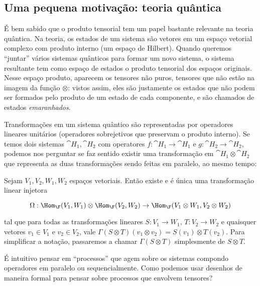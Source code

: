 \documentclass[11pt]{article}
\begin{document}
\subsection{Uma pequena motivação: teoria quântica}
\label{sec:uma-pequena-motivacao-teoria-quantica}
É bem sabido que o produto tensorial tem um papel bastante relevante na teoria quântica. Na teoria, os estados de um sistema são vetores em um espaço vetorial complexo com produto interno (um espaço de Hilbert). Quando queremos ``juntar'' vários sistemas quânticos para formar um novo sistema, o sistema resultante tem como espaço de estados o produto tensorial dos espaços originais. Nesse espaço produto, aparecem os tensores não puros, tensores que não estão na imagem da função \(\otimes\): vistos assim, eles são justamente os estados que não podem ser formados pelo produto de um estado de cada componente, e são chamados de estados \textit{emaranhados}.

Transformações em um sistema quântico são representadas por operadores lineares unitários (operadores sobrejetivos que preservam o produto interno). Se temos dois sistemas \(\cat{H}_1,\cat{H}_2\) com operatores \(f:\cat{H}_1\to\cat{H}_1\) e \(g:\cat{H}_2\to\cat{H}_2\), podemos nos perguntar se faz sentido existir uma transformação em \(\cat{H}_1\otimes\cat{H}_2\) que representa as duas transformações sendo feitas em paralelo, ao mesmo tempo:

\begin{proposition}
Sejam \(V_1,V_2,W_1,W_2\) espaços vetoriais. Então existe e é única uma transformação linear injetora

\begin{equation*}
\Omega :\Hom_{\F}(V_1,W_1) \otimes \Hom_{\F}(V_2,W_2)\to\Hom_{\F}(V_1\otimes W_1,V_2\otimes W_2)
\end{equation*}

tal que para todas as transformações lineares \(S:V_1\to W_1\), \(T:V_2\to W_2\) e quaisquer vetores \(v_1\in V_1\) e \(v_2\in V_2\), vale \(\Gamma(S \otimes T)(v_1 \otimes v_2)=S(v_1)\otimes T(v_2)\). Para simplificar a notação, passaremos a chamar \(\Gamma(S \otimes T)\) simplesmente de \(S\otimes T\).\end{proposition}

É intuitivo pensar em ``processos'' que agem sobre os sistemas compondo operadores em paralelo ou sequencialmente. Como podemos usar desenhos de maneira formal para pensar sobre processos que envolvem tensores?
\end{document}

